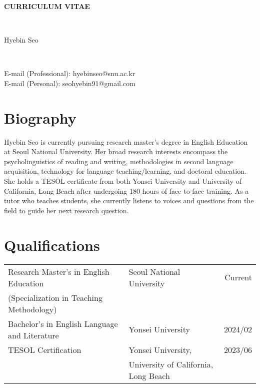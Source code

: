\documentclass[11pt]{article}
\begin{document}
\begin{center}
	\begin{huge}\textbf{CURRICULUM VITAE}\end{huge}\\[0.2cm]
    \begin{large}Hyebin Seo\end{large}\\[0.2cm]
    \begin{small}
E-mail (Professional): hyebinseo@snu.ac.kr\\
E-mail (Personal): seohyebin91@gmail.com
    \end{small}
\end{center}

\section{Biography} %
Hyebin Seo is currently pursuing research master's degree in English Education at Seoul National University. Her broad research interests encompass the psycholinguistics of reading and writing, methodologies in second language acquisition, technology for language teaching/learning, and doctoral education. She holds a TESOL certificate from both Yonsei University and University of California, Long Beach after undergoing 180 hours of face-to-face training. As a tutor who teaches students, she currently listens to voices and questions from the field to guide her next research question. 
\vspace{0.8cm}

\section{Qualifications}
\begin{tabularx}{\textwidth}{X p{8cm} r}
Research Master's in English Education & Seoul National University & Current\\ [-3pt](Specialization in Teaching Methodology) & &\\
Bachelor's in English Language and Literature & Yonsei University & 2024/02\\
TESOL Certification & Yonsei University, & 2023/06\\[-3pt] & University of California, Long Beach & \\  
\end{tabularx}
\vspace{0.8cm}
\end{document}
